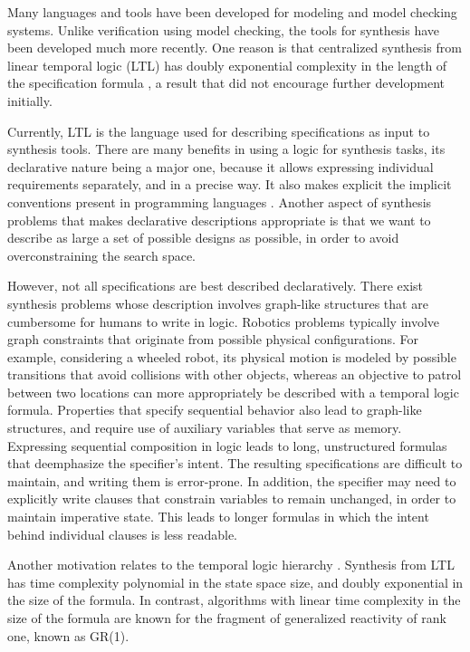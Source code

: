 \documentclass[copyright]{eptcs}
\begin{document}
Many languages and tools have been developed for modeling and model checking systems.
Unlike verification using model checking, the tools for synthesis have been developed much more recently.
One reason is that centralized synthesis from linear temporal logic (LTL) \cite{Pnueli77} has doubly exponential complexity in the length of the specification formula \cite{Rosner92}, a result that did not encourage further development initially.

Currently, LTL is the language used for describing specifications as input to synthesis tools.
There are many benefits in using a logic for synthesis tasks, its declarative nature being a major one, because it allows expressing individual requirements separately, and in a precise way.
It also makes explicit the implicit conventions present in programming languages \cite{Lamport94tpls}.
Another aspect of synthesis problems that makes declarative descriptions appropriate is that we want to describe as large a set of possible designs as possible, in order to avoid overconstraining the search space.

However, not all specifications are best described declaratively.
There exist synthesis problems whose description involves graph-like structures that are cumbersome for humans to write in logic.
Robotics problems typically involve graph constraints that originate from possible physical configurations.
For example, considering a wheeled robot, its physical motion is modeled by possible transitions that avoid collisions with other objects, whereas an objective to patrol between two locations can more appropriately be described with a temporal logic formula.
Properties that specify sequential behavior also lead to graph-like structures, and require use of auxiliary variables that serve as memory.
Expressing sequential composition in logic leads to long, unstructured formulas that deemphasize the specifier's intent.
The resulting specifications are difficult to maintain, and writing them is error-prone.
In addition, the specifier may need to explicitly write clauses that constrain variables to remain unchanged, in order to maintain imperative state.
This leads to longer formulas in which the intent behind individual clauses is less readable.

Another motivation relates to the temporal logic hierarchy \cite{Manna90podc,Schneider04}.
Synthesis from LTL has time complexity polynomial in the state space size, and doubly exponential in the size of the formula.
In contrast, algorithms with linear time complexity in the size of the formula are known for the fragment of generalized reactivity of rank one, known as GR(1).
\end{document}
